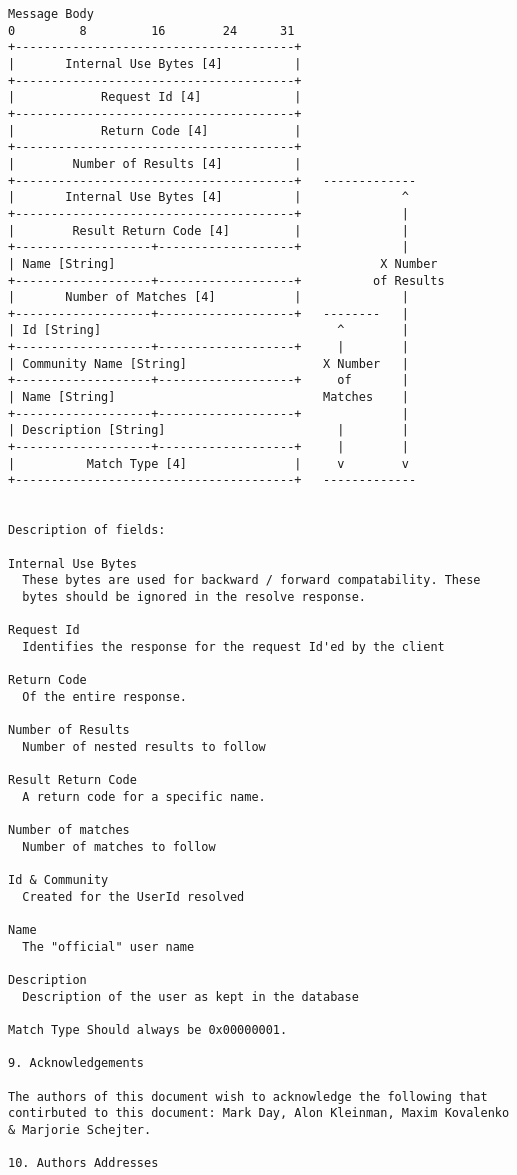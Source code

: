 \documentclass[titlepage,oneside]{book}
\begin{document}
\begin{verbatim}
Message Body
0         8         16        24      31
+---------------------------------------+
|       Internal Use Bytes [4]          |
+---------------------------------------+
|            Request Id [4]             |
+---------------------------------------+
|            Return Code [4]            |
+---------------------------------------+
|        Number of Results [4]          |
+---------------------------------------+   -------------
|       Internal Use Bytes [4]          |              ^
+---------------------------------------+              |
|        Result Return Code [4]         |              |
+-------------------+-------------------+              |
| Name [String]                                     X Number
+-------------------+-------------------+          of Results
|       Number of Matches [4]           |              |
+-------------------+-------------------+   --------   |
| Id [String]                                 ^        |
+-------------------+-------------------+     |        |
| Community Name [String]                   X Number   |
+-------------------+-------------------+     of       |
| Name [String]                             Matches    |
+-------------------+-------------------+              |
| Description [String]                        |        |
+-------------------+-------------------+     |        |
|          Match Type [4]               |     v        v
+---------------------------------------+   -------------


Description of fields:

Internal Use Bytes
  These bytes are used for backward / forward compatability. These
  bytes should be ignored in the resolve response.

Request Id
  Identifies the response for the request Id'ed by the client

Return Code
  Of the entire response.

Number of Results
  Number of nested results to follow

Result Return Code
  A return code for a specific name.

Number of matches
  Number of matches to follow

Id & Community
  Created for the UserId resolved

Name
  The "official" user name

Description
  Description of the user as kept in the database

Match Type Should always be 0x00000001.

9. Acknowledgements

The authors of this document wish to acknowledge the following that
contirbuted to this document: Mark Day, Alon Kleinman, Maxim Kovalenko
& Marjorie Schejter.

10. Authors Addresses
\end{verbatim}
\end{document}
